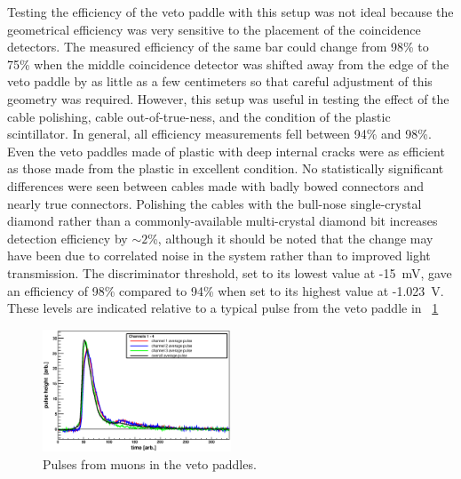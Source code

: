 Testing the efficiency of the veto paddle with this setup was not ideal because the geometrical efficiency was very sensitive to the placement of the coincidence detectors.  The measured efficiency of the same bar could change from 98\% to 75\% when the middle coincidence detector was shifted away from the edge of the veto paddle by as little as a few centimeters so that careful adjustment of this geometry was required.  However, this setup was useful in testing the effect of the cable polishing, cable out-of-true-ness, and the condition of the plastic scintillator.  In general, all efficiency measurements fell between 94\% and 98\%.  Even the veto paddles made of plastic with deep internal cracks were as efficient as those made from the plastic in excellent condition.  No statistically significant differences were seen between cables made with badly bowed connectors and nearly true connectors.  Polishing the cables with the bull-nose single-crystal diamond rather than a commonly-available multi-crystal diamond bit increases detection efficiency by $\sim2$\%, although it should be noted that the change may have been due to correlated noise in the system rather than to improved light transmission.  The discriminator threshold, set to its lowest value at -15~mV, gave an efficiency of 98\% compared to 94\% when set to its highest value at -1.023~V.  These levels are indicated relative to a typical pulse from the veto paddle in {\fig}~\ref{fig:vetoSignal}
\begin{figure}[!htbp]
\centering
\includegraphics[width=0.5\textwidth]{figures/PulseChan_1_4.eps}
\caption{Pulses from muons in the veto paddles.}
\label{fig:vetoSignal}
\end{figure}


